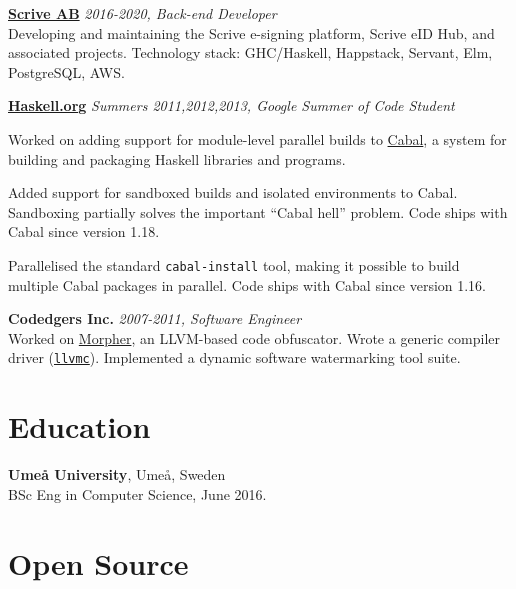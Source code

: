 \documentclass[margin,line]{res}
\begin{document}
\begin{resume}
            {\bf \href{https://scrive.com}{Scrive AB}} \hfill {\it 2016-2020, Back-end Developer}\\
      Developing and maintaining the Scrive e-signing platform, Scrive eID
      Hub, and associated projects.
      Technology stack: GHC/Haskell, Happstack, Servant, Elm, PostgreSQL, AWS.

            {\bf \href{https://haskell.org}{Haskell.org}} \hfill {\it Summers 2011,2012,2013, Google Summer of Code Student}\\
      \begin{list}{}{\leftmargin=1.5em}
            \item Worked on adding support for module-level parallel builds to
                  \href{https://haskell.org/cabal}{Cabal}, a system for building and
                  packaging Haskell libraries and programs.

            \item Added support for sandboxed builds and isolated environments to
                  Cabal. Sandboxing partially solves the important ``Cabal hell'' problem. Code
                  ships with Cabal since version 1.18.

            \item Parallelised the standard \texttt{cabal-install} tool, making it possible to
                  build multiple Cabal packages in parallel. Code ships with Cabal since version
                  1.16.
      \end{list}

      {\bf Codedgers Inc.} \hfill {\it 2007-2011, Software Engineer}\\
      Worked on \href{https://archive.is/ZAI8z}{Morpher}, an LLVM-based code
      obfuscator. Wrote a generic compiler driver
      (\href{https://llvm.org/releases/2.9/docs/CompilerDriver.html}{\texttt{llvmc}}). Implemented
      a dynamic software watermarking tool suite.

      \section{\sc Education}
       {\bf Umeå University}, Umeå, Sweden\\
      BSc Eng in Computer Science, June 2016.

      \section{\sc Open Source}


\end{resume}
\end{document}
